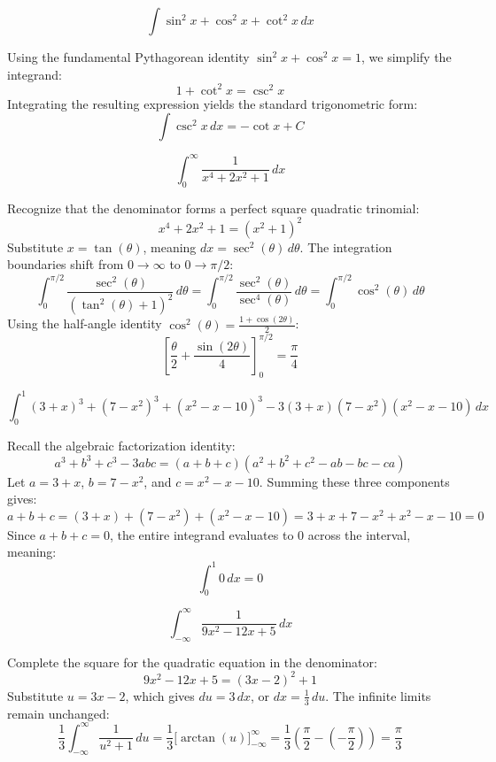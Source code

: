 \begin{questions}
    \question \[ \int \sin^2 x + \cos^2 x + \cot^2 x \,dx \]
    \begin{solution}
        Using the fundamental Pythagorean identity $\sin^2 x + \cos^2 x = 1$, we simplify the integrand:
        \[ 1 + \cot^2 x = \csc^2 x \]
        Integrating the resulting expression yields the standard trigonometric form:
        \[ \int \csc^2 x \,dx = -\cot x + C \]
    \end{solution}

    \question \[ \int_0^\infty \frac{1}{x^4 + 2x^2 + 1} \,dx \]
    \begin{solution}
        Recognize that the denominator forms a perfect square quadratic trinomial:
        \[ x^4 + 2x^2 + 1 = (x^2 + 1)^2 \]
        Substitute $x = \tan(\theta)$, meaning $dx = \sec^2(\theta) \,d\theta$. The integration boundaries shift from $0 \to \infty$ to $0 \to \pi/2$:
        \[ \int_0^{\pi/2} \frac{\sec^2(\theta)}{(\tan^2(\theta) + 1)^2} \,d\theta = \int_0^{\pi/2} \frac{\sec^2(\theta)}{\sec^4(\theta)} \,d\theta = \int_0^{\pi/2} \cos^2(\theta) \,d\theta \]
        Using the half-angle identity $\cos^2(\theta) = \frac{1 + \cos(2\theta)}{2}$:
        \[ \left[ \frac{\theta}{2} + \frac{\sin(2\theta)}{4} \right]_0^{\pi/2} = \frac{\pi}{4} \]
    \end{solution}

    \question \[ \int_0^1 (3+x)^3 + (7-x^2)^3 + (x^2-x-10)^3 - 3(3+x)(7-x^2)(x^2-x-10) \,dx \]
    \begin{solution}
        Recall the algebraic factorization identity:
        \[ a^3 + b^3 + c^3 - 3abc = (a+b+c)(a^2+b^2+c^2 - ab - bc - ca) \]
        Let $a = 3+x$, $b = 7-x^2$, and $c = x^2-x-10$. Summing these three components gives:
        \[ a + b + c = (3+x) + (7-x^2) + (x^2-x-10) = 3 + x + 7 - x^2 + x^2 - x - 10 = 0 \]
        Since $a+b+c = 0$, the entire integrand evaluates to $0$ across the interval, meaning:
        \[ \int_0^1 0 \,dx = 0 \]
    \end{solution}

    \question \[ \int_{-\infty}^\infty \frac{1}{9x^2 - 12x + 5} \,dx \]
    \begin{solution}
        Complete the square for the quadratic equation in the denominator:
        \[ 9x^2 - 12x + 5 = (3x - 2)^2 + 1 \]
        Substitute $u = 3x - 2$, which gives $du = 3 \,dx$, or $dx = \frac{1}{3} \,du$. The infinite limits remain unchanged:
        \[ \frac{1}{3} \int_{-\infty}^\infty \frac{1}{u^2 + 1} \,du = \frac{1}{3} \Big[ \arctan(u) \Big]_{-\infty}^\infty = \frac{1}{3} \left( \frac{\pi}{2} - \left(-\frac{\pi}{2}\right) \right) = \frac{\pi}{3} \]
    \end{solution}


\end{questions}
